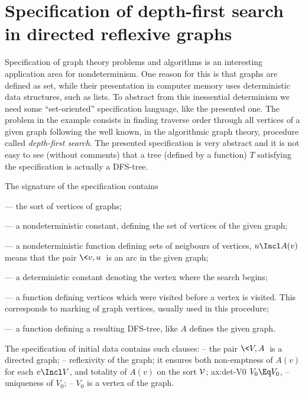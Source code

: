 


\section*{Specification of depth-first search in directed reflexive graphs}

Specification of graph theory problems and algorithms is an interesting
application area for nondeterminism. One reason for this is
that graphs are defined as set, while their presentation in computer memory
uses deterministic data structures, such as lists. To abstract from this
inessential determinism we need some ``set-oriented''
specification language, like the presented one. The problem in the example
consists in finding traverse order through all vertices of a given graph
following the well known, in the algorithmic graph theory, procedure called {\em
depth-first search}. The presented specification is very abstract and it is
not easy to see (without comments) that a tree (defined by a function)
$T$ satisfying the specification is actually a DFS-tree.

The signature of the  specification contains
\begin{description}\MyLPar
\item[\(\cal V\)] --- the sort of vertices of graphs;
\item[\(V:\ \to \cal V\)] --- a nondeterministic constant, defining the set of
vertices of the given graph; 
\item[\(A:\cal V\to\cal V\)] --- a nondeterministic function defining sets
of neigbours of vertices, \(u\Incl A(v)\) means that the pair \(\<v,u\>\) is
an arc in the given graph;
\item[\(V_0:\ \to\cal V\)] --- a deterministic constant denoting the vertex
where the search begins;
\item[\(M:\cal V\to\cal V\)] --- a function defining vertices which were
visited before a vertex is visited. This corresponds to marking of graph
vertices, usually used in this procedure; 
\item[\(T:\cal V\to\cal V\)] --- a function defining a resulting DFS-tree,
like $A$ defines the given graph.
\end{description}

The specification of initial data contains such clauses:
   -- the pair \(\<V,A\>\) is a directed graph;
   -- reflexivity of the graph; it ensures both
   non-emptness of \(A(v)\) for each \(v\Incl V\), and totality of \(A(v)\) on
the sort \(\cal V\); 
 {ax:det-V0} {$V_0\Eq V_0$,} 
   -- uniqueness of \(V_0\);
   -- \(V_0\) is a vertex of the graph.

